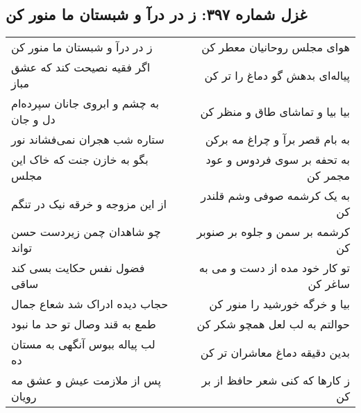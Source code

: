 \begin{center}
\section*{غزل شماره ۳۹۷: ز در درآ و شبستان ما منور کن}
\label{sec:sh397}
\begin{longtable}{l p{0.5cm} r}
ز در درآ و شبستان ما منور کن
&&
هوای مجلس روحانیان معطر کن
\\
اگر فقیه نصیحت کند که عشق مباز
&&
پیاله‌ای بدهش گو دماغ را تر کن
\\
به چشم و ابروی جانان سپرده‌ام دل و جان
&&
بیا بیا و تماشای طاق و منظر کن
\\
ستاره شب هجران نمی‌فشاند نور
&&
به بام قصر برآ و چراغ مه برکن
\\
بگو به خازن جنت که خاک این مجلس
&&
به تحفه بر سوی فردوس و عود مجمر کن
\\
از این مزوجه و خرقه نیک در تنگم
&&
به یک کرشمه صوفی وشم قلندر کن
\\
چو شاهدان چمن زیردست حسن تواند
&&
کرشمه بر سمن و جلوه بر صنوبر کن
\\
فضول نفس حکایت بسی کند ساقی
&&
تو کار خود مده از دست و می به ساغر کن
\\
حجاب دیده ادراک شد شعاع جمال
&&
بیا و خرگه خورشید را منور کن
\\
طمع به قند وصال تو حد ما نبود
&&
حوالتم به لب لعل همچو شکر کن
\\
لب پیاله ببوس آنگهی به مستان ده
&&
بدین دقیقه دماغ معاشران تر کن
\\
پس از ملازمت عیش و عشق مه رویان
&&
ز کارها که کنی شعر حافظ از بر کن
\\
\end{longtable}
\end{center}
